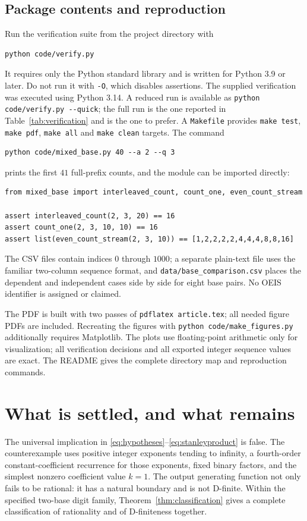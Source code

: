 \documentclass[11pt,letterpaper]{article}
\numberwithin{equation}{section}
\theoremstyle{definition}
\theoremstyle{remark}
\begin{document}
\subsection{Package contents and reproduction}
Run the verification suite from the project directory with
\begin{lstlisting}
python code/verify.py
\end{lstlisting}
It requires only the Python standard library and is written for Python
3.9 or later. Do not run it with \texttt{-O}, which disables assertions.
The supplied verification was executed using Python 3.14.
A reduced run is available as \texttt{python code/verify.py -{}-quick};
the full run is the one reported in Table~\ref{tab:verification} and is
the one to prefer. A \texttt{Makefile} provides \texttt{make test},
\texttt{make pdf}, \texttt{make all} and \texttt{make clean} targets.
The command
\begin{lstlisting}
python code/mixed_base.py 40 --a 2 --q 3
\end{lstlisting}
prints the first $41$ full-prefix counts, and the module can be imported
directly:
\begin{lstlisting}
from mixed_base import interleaved_count, count_one, even_count_stream

assert interleaved_count(2, 3, 20) == 16
assert count_one(2, 3, 10, 10) == 16
assert list(even_count_stream(2, 3, 10)) == [1,2,2,2,2,4,4,4,8,8,16]
\end{lstlisting}
The CSV files contain indices $0$ through $1000$; a separate plain-text
file uses the familiar two-column sequence format, and
\texttt{data/base\_comparison.csv} places the dependent and independent
cases side by side for eight base pairs. No OEIS identifier is
assigned or claimed.

The PDF is built with two passes of \texttt{pdflatex article.tex}; all
needed figure PDFs are included. Recreating the figures with
\texttt{python code/make\_figures.py} additionally requires Matplotlib.
The plots use floating-point arithmetic only for visualization; all
verification decisions and all exported integer sequence values are exact.
The README gives the complete directory map and reproduction commands.

\section{What is settled, and what remains}\label{sec:scope}

The universal implication in \eqref{eq:hypotheses}--\eqref{eq:stanleyproduct}
is false. The counterexample uses positive integer exponents tending to
infinity, a fourth-order constant-coefficient recurrence for those exponents,
fixed binary factors, and the simplest nonzero coefficient value $k=1$.
The output generating function not only fails to be rational: it has a
natural boundary and is not D-finite. Within the specified two-base digit
family, Theorem~\ref{thm:classification} gives a complete classification of
rationality and of D-finiteness together.
\end{document}
